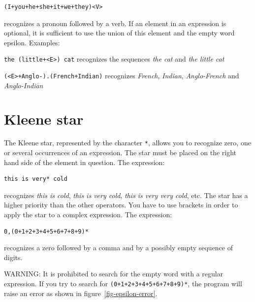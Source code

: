 \begin{verbatim}
(I+you+he+she+it+we+they)<V>
\end{verbatim}

\noindent
recognizes a pronoun followed by a verb. If an element in an
expression is optional, it is sufficient to use the union of this
element and the empty word epsilon.  Examples:

\bigskip
\noindent \verb$the (little+<E>) cat$ recognizes the sequences \textit{the cat}
and \textit{the little cat}

\smallskip
\noindent \verb$(<E>+Anglo-).(French+Indian)$ recognizes \textit{French}, \textit{Indian},
\textit{Anglo-French} and \textit{Anglo-Indian}

\section{Kleene star}
\index{\verbc{*}}
The Kleene star, represented by the character \verb+*+,  allows you to recognize
zero, one or several occurrences of an expression. The star must be placed on
the right hand side of the element in question. The expression:

\begin{verbatim}
this is very* cold
\end{verbatim}

\noindent recognizes \textit{this is cold}, \textit{this is very cold},
\textit{this is very very cold}, etc. The star has a higher priority than the
other operators. You have to use brackets in order to apply the star to a complex
expression. The expression:


\begin{verbatim}
0,(0+1+2+3+4+5+6+7+8+9)*
\end{verbatim}

\noindent recognizes a zero followed by a comma and by a possibly empty sequence of
digits.

\bigskip
\noindent WARNING: It is prohibited to search for the empty word with a regular
expression. If you try to search for \verb$(0+1+2+3+4+5+6+7+8+9)*$, the program
will raise an error as shown in
figure~\ref{fig-epsilon-error}.


